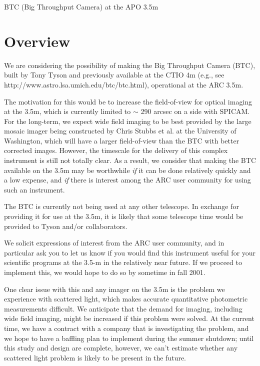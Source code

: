 \documentclass{article}
\begin{document}
\begin{Huge}
\begin{center}
BTC (Big Throughput Camera) at the APO 3.5m
\end{center}
\end{Huge}

\section{Overview}

  We are considering the possibility of making the Big Throughput
Camera (BTC), built by Tony Tyson and previously available at the CTIO
4m (e.g., see 
{http://www.astro.lsa.umich.edu/btc/btc.html}), operational at the ARC 3.5m.

  The motivation for this would be to increase the field-of-view for
optical imaging at the 3.5m, which is currently limited to $\sim$
290 arcsec on a side with SPICAM. For the long-term, we expect wide field
imaging to be best provided by the large mosaic imager being constructed
by Chris Stubbs et al. at the University of Washington, which will have a
larger field-of-view than the BTC with better corrected images.  However,
the timescale for the delivery of this complex instrument is still not
totally clear. As a result, we consider that making the BTC available on
the 3.5m may be worthwhile \textit{if} it can be done relatively quickly
and a low expense, and \textit{if} there is interest among the ARC user
community for using such an instrument.

The BTC is currently not being used at any other telescope. In exchange
for providing it for use at the 3.5m, it is likely that some telescope
time would be provided to Tyson and/or collaborators.

We solicit expressions of interest from the ARC user community, and
in particular ask you to let us know if you would find this
instrument useful for your scientific programs at the 3.5-m in the relatively
near future. If we proceed to implement this, we would hope to do so by
sometime in fall 2001.

One clear issue with this and any imager on the 3.5m is the problem we
experience with scattered light, which makes accurate quantitative photometric 
measurements difficult. We anticipate that the demand for imaging, including
wide field imaging, might be increased if this problem were solved. At the
current time, we have a contract with a company that is investigating the
problem, and we hope to have a baffling plan to implement during the summer
shutdown; until this study and design are complete, however, we can't
estimate whether any scattered light problem is likely to be present in
the future.
\end{document}
